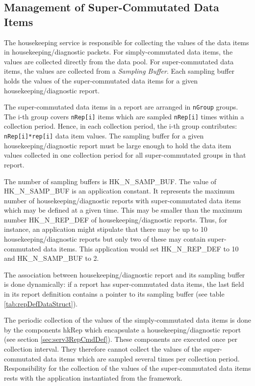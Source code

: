 \documentclass{pnp_article}
\begin{document}
\subsection{Management of Super-Commutated Data Items}\label{sec:serv3SupCommDataItems}
The housekeeping service is responsible for collecting the values of the data items in housekeeping/diagnostic packets. For simply-commutated data items, the values are collected directly from the data pool. For super-commutated data items, the values are collected from a \textit{Sampling Buffer}. Each sampling buffer holds the values of the super-commutated data items for a given housekeeping/diagnostic report.

The super-commutated data items in a report are arranged in \texttt{nGroup} groups. The i-th group covers \texttt{nRep[i]} items which are sampled \texttt{nRep[i]} times within a collection period. Hence, in each collection period, the i-th group contributes: \texttt{nRep[i]*rep[i]} data item values. The sampling buffer for a given housekeeping/diagnostic report must be large enough to hold the data item values collected in one collection period for all super-commutated groups in that report.

The number of sampling buffers is HK\_N\_SAMP\_BUF. The value of HK\_N\_SAMP\_BUF is an application constant. It represents the maximum number of housekeeping/diagnostic reports with super-commutated data items which may be defined at a given time. This may be smaller than the maximum number HK\_N\_REP\_DEF of housekeeping/diagnostic reports. Thus, for instance, an application might stipulate that there may be up to 10 housekeeping/diagnostic reports but only two of these may contain super-commutated data items. This application would set HK\_N\_REP\_DEF to 10 and  HK\_N\_SAMP\_BUF to 2.

The association between housekeeping/diagnostic report and its sampling buffer is done dynamically: if a report has super-commutated data items, the last field in its report definition contains a pointer to its sampling buffer (see table \ref{tab:repDefDataStruct}).

The periodic collection of the values of the simply-commutated data items is done by the components hkRep which encapsulate a housekeeping/diagnostic report (see section \ref{sec:serv3RepCmdDef}). These components are executed once per collection interval. They therefore cannot collect the values of the super-commutated data items which are sampled several times per collection period. Responsibility for the collection of the values of the super-commutated data items rests with the application instantiated from the framework. 
\end{document}
